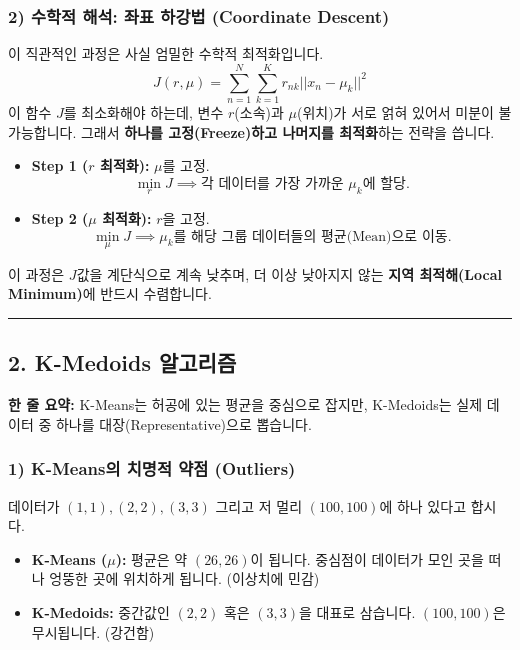 \documentclass[11pt,a4paper]{book}
\theoremstyle{definition}
\begin{document}
\subsubsection*{2) 수학적 해석: 좌표 하강법 (Coordinate Descent)}
이 직관적인 과정은 사실 엄밀한 수학적 최적화입니다.
$$ J(r, \mu) = \sum_{n=1}^{N} \sum_{k=1}^{K} r_{nk} ||x_n - \mu_k||^2 $$
이 함수 $J$를 최소화해야 하는데, 변수 $r$(소속)과 $\mu$(위치)가 서로 얽혀 있어서 미분이 불가능합니다. 그래서 \textbf{하나를 고정(Freeze)하고 나머지를 최적화}하는 전략을 씁니다.

\begin{itemize}
    \item \textbf{Step 1 ($r$ 최적화):} $\mu$를 고정.
    $$ \min_r J \implies \text{각 데이터를 가장 가까운 } \mu_k \text{에 할당.} $$
    \item \textbf{Step 2 ($\mu$ 최적화):} $r$을 고정.
    $$ \min_\mu J \implies \mu_k \text{를 해당 그룹 데이터들의 평균(Mean)으로 이동.} $$
\end{itemize}
이 과정은 $J$값을 계단식으로 계속 낮추며, 더 이상 낮아지지 않는 \textbf{지역 최적해(Local Minimum)}에 반드시 수렴합니다.

\vspace{0.5cm}\hrule\vspace{0.5cm}

\subsection{2. K-Medoids 알고리즘}


\begin{conceptbox}[title={개념 2: 평균의 함정과 실제 대표 선출}]
\textbf{한 줄 요약:} K-Means는 허공에 있는 평균을 중심으로 잡지만, K-Medoids는 실제 데이터 중 하나를 대장(Representative)으로 뽑습니다.
\end{conceptbox}

\subsubsection*{1) K-Means의 치명적 약점 (Outliers)}
데이터가 $(1,1), (2,2), (3,3)$ 그리고 저 멀리 $(100,100)$에 하나 있다고 합시다.
\begin{itemize}
    \item \textbf{K-Means ($\mu$):} 평균은 약 $(26, 26)$이 됩니다. 중심점이 데이터가 모인 곳을 떠나 엉뚱한 곳에 위치하게 됩니다. (이상치에 민감)
    \item \textbf{K-Medoids:} 중간값인 $(2,2)$ 혹은 $(3,3)$을 대표로 삼습니다. $(100,100)$은 무시됩니다. (강건함)
\end{itemize}
\end{document}
